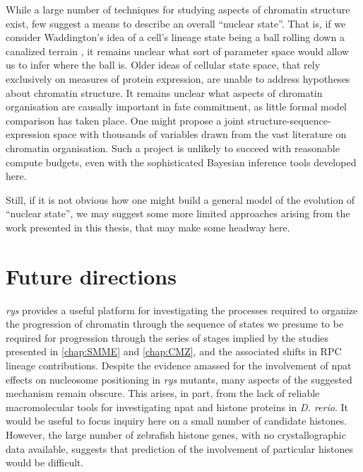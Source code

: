 While a large number of techniques for studying aspects of chromatin structure exist, few suggest a means to describe an overall ``nuclear state''. That is, if we consider Waddington's idea of a cell's lineage state being a ball rolling down a canalized terrain \cite{Waddington1957}, it remains unclear what sort of parameter space would allow us to infer where the ball is. Older ideas of cellular state space, that rely exclusively on measures of protein expression, are unable to address hypotheses about chromatin structure. It remains unclear what aspects of chromatin organisation are causally important in fate commitment, as little formal model comparison has taken place. One might propose a joint structure-sequence-expression space with thousands of variables drawn from the vast literature on chromatin organisation. Such a project is unlikely to succeed with reasonable compute budgets, even with the sophisticated Bayesian inference tools developed here.

Still, if it is not obvious how one might build a general model of the evolution of ``nuclear state'', we may suggest some more limited approaches arising from the work presented in this thesis, that may make some headway here.

\section{Future directions}
\textit{rys} provides a useful platform for investigating the processes required to organize the progression of chromatin through the sequence of states we presume to be required for progression through the series of stages implied by the studies presented in \autoref{chap:SMME} and \autoref{chap:CMZ}, and the associated shifts in RPC lineage contributions. Despite the evidence amassed for the involvement of npat effects on nucleosome positioning in \textit{rys} mutants, many aspects of the suggested mechanism remain obscure. This arises, in part, from the lack of reliable macromolecular tools for investigating npat and histone proteins in \textit{D. rerio}. It would be useful to focus inquiry here on a small number of candidate histones. However, the large number of zebrafish histone genes, with no crystallographic data available, suggests that prediction of the involvement of particular histones would be difficult.

